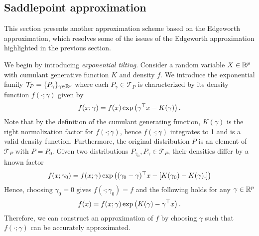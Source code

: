 \subsection{Saddlepoint approximation} \label{sec-saddlepoint}

This section presents another approximation scheme based on the Edgeworth approximation, which resolves some of the issues of the Edgeworth approximation highlighted in the previous section.

We begin by introducing \textit{exponential tilting}. Consider a random variable $X \in {\mathbb{R}^p}$ with cumulant generative function $K$ and density $f$. We introduce the exponential family $\mathcal{T}_P = \{ P_\gamma \}_{\gamma \in {\mathbb{R}^p}}$ where each $P_\gamma \in \mathcal{T}_P$ is characterized by its density function $f(\cdot; \gamma)$ given by
\begin{equation*}
    f(x; \gamma) = f(x)\exp\left(\gamma^\top x - K(\gamma)\right).
\end{equation*}
Note that by the definition of the cumulant generating function, $K(\gamma)$ is the right normalization factor for $f(\cdot; \gamma)$, hence $f(\cdot; \gamma)$ integrates to 1 and is a valid density function. Furthermore, the original distribution $P$ is an element of $\mathcal{T}_P$ with $P = P_0$. Given two distributions $P_{\gamma_0}, P_\gamma \in \mathcal{T}_P$, their densities differ by a known factor
\begin{equation*}
    f(x; \gamma_0) = f(x; \gamma)\exp\left((\gamma_0 - \gamma)^\top x - \left[K(\gamma_0) - K(\gamma).\right]\right)
\end{equation*} 
Hence, choosing $\gamma_0 = 0$ gives $f(\cdot; \gamma_0) = f$ and the following holds for any $\gamma \in {\mathbb{R}^p}$
\begin{equation} \label{eq-saddlepoint-original}
    f(x) = f(x; \gamma)\exp\left(K(\gamma) - \gamma^\top x\right).
\end{equation}
Therefore, we can construct an approximation of $f$ by choosing $\gamma$ such that $f(\cdot; \gamma)$ can be accurately approximated.

